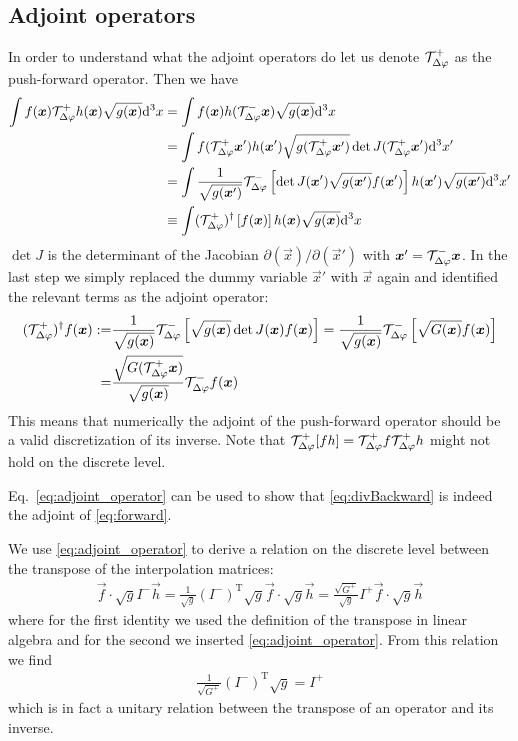 \subsection{Adjoint operators}
In order to understand what the adjoint operators do let us denote $\mathcal T^+_{\Delta\varphi}$ as the push-forward operator. Then we have
\begin{align}
    \int f(\vec x) \Tp h(\vec x) \sqrt{g(\vec x)}\d^3x%
    &=  \int f(\vec x) h(\Tm \vec x)\sqrt{g(\vec x)}\d^3x \nonumber\\
    &=  \int f(\Tp \vec x') h(\vec x')\sqrt{g(\Tp \vec x')}\det J( \Tp\vec x') \d^3x' \nonumber\\
    &=  \int \frac{1}{\sqrt{g(\vec x')}}\Tm\left[\det J(\vec x')\sqrt{g(\vec x')}f(\vec x')\right] h(\vec x')\sqrt{g(\vec x')}   \d^3x' \nonumber \\
    &\equiv  \int (\Tp)^\dagger\left[f(\vec x)\right] h(\vec x)\sqrt{g(\vec x)}   \d^3x
    \label{}
\end{align}
$\det J$ is the determinant of the Jacobian $\partial(\vec x)/\partial(\vec x')$ with ${\boldsymbol{x}}' = \mathcal T^-_{\Delta\varphi} {\boldsymbol{x}}$.
In the last step we simply replaced the dummy variable $\vec x'$ with $\vec x$ again and identified the relevant terms
as the adjoint operator:
\begin{align}
    (\mathcal T^+_{\Delta\varphi})^\dagger f({\boldsymbol{x}} ) :=& \frac{1}{\sqrt{g({\boldsymbol{x}})}} \mathcal T^-_{\Delta\varphi}\left[\sqrt{g({\boldsymbol{x}})} \det J({\boldsymbol{x}}) f({\boldsymbol{x}}) \right]
    = \frac{1}{\sqrt{g({\boldsymbol{x}})}} \mathcal T^-_{\Delta\varphi}\left[\sqrt{G({\boldsymbol{x}})}f({\boldsymbol{x}}) \right]
    \nonumber\\
    =& \frac{\sqrt{G(\mathcal T^+_{\Delta\varphi} {\boldsymbol{x}})}}{\sqrt{g({\boldsymbol{x}})}} \mathcal T^-_{\Delta\varphi} f({\boldsymbol{x}})
    \label{eq:adjoint_operator}
\end{align}
This means that numerically the adjoint of the push-forward
operator should be a valid discretization of its inverse.
Note that $\mathcal T^+_{\Delta\varphi} [fh] = \mathcal T^+_{\Delta\varphi} f \mathcal T^+_{\Delta\varphi} h$ might not
hold on the discrete level.

Eq.~\eqref{eq:adjoint_operator} can be used to show that \eqref{eq:divBackward}
is indeed the adjoint of \eqref{eq:forward}.

We use \eqref{eq:adjoint_operator} to derive a relation on the discrete level
between the transpose of the interpolation matrices:
\begin{align*}
    \vec f\cdot \sqrt{g} I^{-} \vec h
    =
    \frac{1}{\sqrt{g}} (I^{-})^\mathrm{T} \sqrt{g} \vec f \cdot \sqrt{g}  \vec h
    =
    \frac{\sqrt{G^+}}{\sqrt{g}} I^{+} \vec f \cdot \sqrt{g}  \vec h
\end{align*}
where for the first identity we used the definition of the transpose in linear
algebra and for the second we inserted \eqref{eq:adjoint_operator}.
From this relation we find
\begin{align} \label{eq:unitary}
    \frac{1}{\sqrt{G^+}}(I^{-})^\mathrm{T}\sqrt{g} = I^+
\end{align}
which is in fact a unitary relation between the transpose of an operator and
its inverse.
